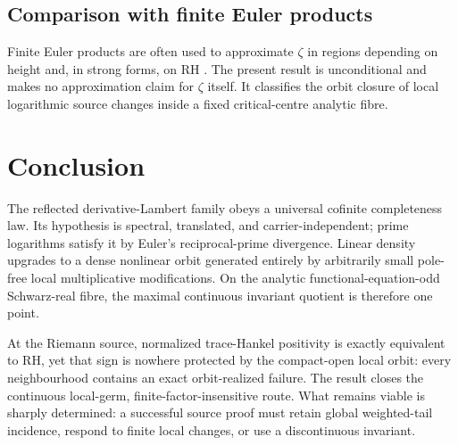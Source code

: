 \documentclass[11pt]{article}
\begin{document}
\subsection{Comparison with finite Euler products}

Finite Euler products are often used to approximate \(\zeta\) in regions depending
on height and, in strong forms, on RH \cite{Gonek2007}.  The present result is
unconditional and makes no approximation claim for \(\zeta\) itself.  It classifies
the orbit closure of local logarithmic source changes inside a fixed
critical-centre analytic fibre.

\section{Conclusion}

The reflected derivative-Lambert family obeys a universal cofinite completeness law.
Its hypothesis is spectral, translated, and carrier-independent; prime logarithms
satisfy it by Euler's reciprocal-prime divergence.  Linear density upgrades to a
dense nonlinear orbit generated entirely by arbitrarily small pole-free local
multiplicative modifications.  On the analytic functional-equation-odd
Schwarz-real fibre, the maximal continuous invariant quotient is therefore one
point.

At the Riemann source, normalized trace-Hankel positivity is exactly equivalent to
RH, yet that sign is nowhere protected by the compact-open local orbit: every
neighbourhood contains an exact orbit-realized failure.  The result closes the
continuous local-germ, finite-factor-insensitive route.  What remains viable is
sharply determined: a successful source proof must retain global weighted-tail
incidence, respond to finite local changes, or use a discontinuous invariant.
\end{document}
